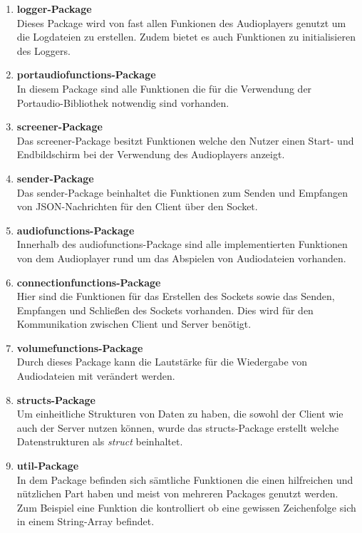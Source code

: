 \begin{enumerate}
\item \textbf{logger-Package} \\
Dieses Package wird von fast allen Funkionen des Audioplayers genutzt um die
Logdateien zu erstellen. Zudem bietet es auch Funktionen zu initialisieren des
Loggers.

\item \textbf{portaudiofunctions-Package} \\
In diesem Package sind alle Funktionen die für die Verwendung der
Portaudio-Bibliothek notwendig sind vorhanden. 


\item \textbf{screener-Package} \\
Das screener-Package besitzt Funktionen welche den Nutzer einen Start- und
Endbildschirm bei der Verwendung des Audioplayers anzeigt.


\item \textbf{sender-Package} \\
Das sender-Package beinhaltet die Funktionen zum Senden und Empfangen von
JSON-Nachrichten für den Client über den Socket.


\item \textbf{audiofunctions-Package} \\
Innerhalb des audiofunctions-Package sind alle implementierten Funktionen von
dem Audioplayer rund um das Abspielen von Audiodateien vorhanden.

\item \textbf{connectionfunctions-Package} \\
Hier sind die Funktionen für das Erstellen des Sockets sowie das Senden,
Empfangen und Schließen des Sockets vorhanden. Dies wird für den Kommunikation
zwischen Client und Server benötigt.

\item \textbf{volumefunctions-Package} \\
Durch dieses Package kann die Lautstärke für die Wiedergabe von Audiodateien
mit verändert werden.

\item \textbf{structs-Package} \\
Um einheitliche Strukturen von Daten zu haben, die sowohl der Client wie auch
der Server nutzen können, wurde das structs-Package erstellt welche
Datenstrukturen als \textit{struct} beinhaltet.

\item \textbf{util-Package} \\
In dem Package befinden sich sämtliche Funktionen die einen hilfreichen und
nützlichen Part haben und meist von mehreren Packages genutzt werden. Zum
Beispiel eine Funktion die kontrolliert ob eine gewissen Zeichenfolge sich in
einem String-Array befindet.
\end{enumerate}



